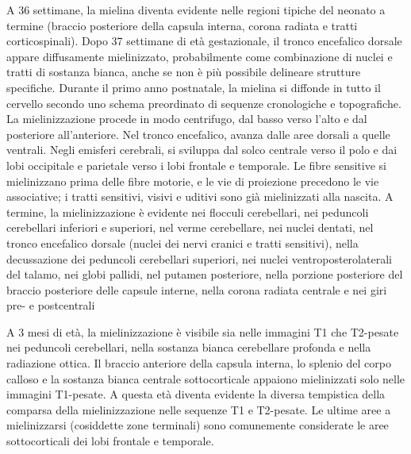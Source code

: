 A 36 settimane, la mielina diventa evidente nelle regioni tipiche del neonato a termine (braccio posteriore della capsula interna, corona radiata e tratti corticospinali). Dopo 37 settimane di età gestazionale, il tronco encefalico dorsale appare diffusamente mielinizzato, probabilmente come combinazione di nuclei e tratti di sostanza bianca, anche se non è più possibile delineare strutture specifiche. Durante il primo anno postnatale, la mielina si diffonde in tutto il cervello secondo uno schema preordinato di sequenze cronologiche e topografiche. La mielinizzazione procede in modo centrifugo, dal basso verso l'alto e dal posteriore all'anteriore. Nel tronco encefalico, avanza dalle aree dorsali a quelle ventrali. Negli emisferi cerebrali, si sviluppa dal solco centrale verso il polo e dai lobi occipitale e parietale verso i lobi frontale e temporale. Le fibre sensitive si mielinizzano prima delle fibre motorie, e le vie di proiezione precedono le vie associative; i tratti sensitivi, visivi e uditivi sono già mielinizzati alla nascita. A termine, la mielinizzazione è evidente nei flocculi cerebellari, nei peduncoli cerebellari inferiori e superiori, nel verme cerebellare, nei nuclei dentati, nel tronco encefalico dorsale (nuclei dei nervi cranici e tratti sensitivi), nella decussazione dei peduncoli cerebellari superiori, nei nuclei ventroposterolaterali del talamo, nei globi pallidi, nel putamen posteriore, nella porzione posteriore del braccio posteriore delle capsule interne, nella corona radiata centrale e nei giri pre- e postcentrali

A 3 mesi di età, la mielinizzazione è visibile sia nelle immagini T1 che T2-pesate nei peduncoli cerebellari, nella sostanza bianca cerebellare profonda e nella radiazione ottica. Il braccio anteriore della capsula interna, lo splenio del corpo calloso e la sostanza bianca centrale sottocorticale appaiono mielinizzati solo nelle immagini T1-pesate. A questa età diventa evidente la diversa tempistica della comparsa della mielinizzazione nelle sequenze T1 e T2-pesate. Le ultime aree a mielinizzarsi (cosiddette zone terminali) sono comunemente considerate le aree sottocorticali dei lobi frontale e temporale.